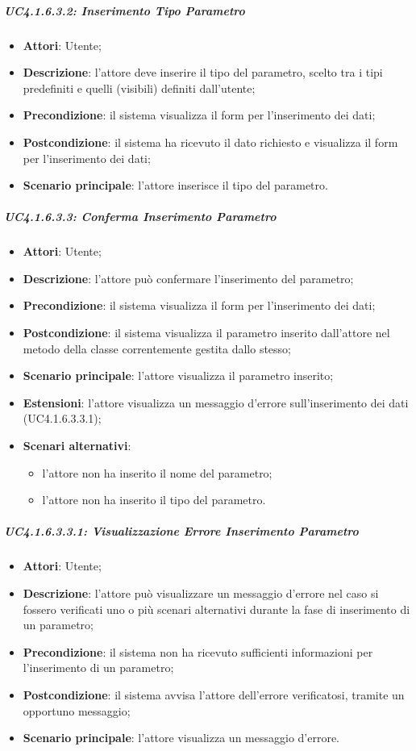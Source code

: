 \subparagraph{UC4.1.6.3.2: Inserimento Tipo Parametro}
\label{UC4.1.6.3.2}
\begin{itemize}
	\item \textbf{Attori}: Utente;
	\item \textbf{Descrizione}: l'attore deve inserire il tipo del parametro, scelto tra i tipi predefiniti e quelli (visibili) definiti dall'utente;
	\item \textbf{Precondizione}: il sistema visualizza il form per l'inserimento dei dati;
	\item \textbf{Postcondizione}: il sistema ha ricevuto il dato richiesto e visualizza il form per l'inserimento dei dati;
	\item \textbf{Scenario principale}: l'attore inserisce il tipo del parametro.
\end{itemize}

\subparagraph{UC4.1.6.3.3: Conferma Inserimento Parametro}
\label{UC4.1.6.3.3}
\begin{itemize}
	\item \textbf{Attori}: Utente;
	\item \textbf{Descrizione}: l'attore può confermare l'inserimento del parametro;
	\item \textbf{Precondizione}: il sistema visualizza il form per l'inserimento dei dati;
	\item \textbf{Postcondizione}: il sistema visualizza il parametro inserito dall'attore nel metodo della classe correntemente gestita dallo stesso;
	\item \textbf{Scenario principale}: l'attore visualizza il parametro inserito;
	\item \textbf{Estensioni}: l'attore visualizza un messaggio d'errore sull'inserimento dei dati (UC4.1.6.3.3.1);
	\item \textbf{Scenari alternativi}:
	\begin{itemize}
		\item l'attore non ha inserito il nome del parametro;
		\item l'attore non ha inserito il tipo del parametro.
	\end{itemize}
\end{itemize}

\subparagraph{UC4.1.6.3.3.1: Visualizzazione Errore Inserimento Parametro}
\label{UC4.1.6.3.3.1}
\begin{itemize}
	\item \textbf{Attori}: Utente;
	\item \textbf{Descrizione}: l'attore può visualizzare un messaggio d'errore nel caso si fossero verificati uno o più scenari alternativi durante la fase di inserimento di un parametro;
	\item \textbf{Precondizione}: il sistema non ha ricevuto sufficienti informazioni per l'inserimento di un parametro;
	\item \textbf{Postcondizione}: il sistema avvisa l'attore dell'errore verificatosi, tramite un opportuno messaggio;
	\item \textbf{Scenario principale}: l'attore visualizza un messaggio d'errore.
\end{itemize}

